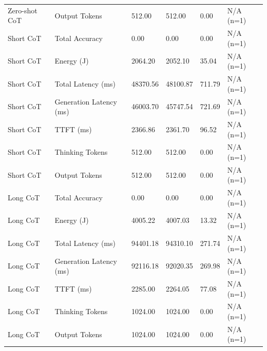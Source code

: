 \begin{table}
\begin{tabular}{llllll}
Zero-shot CoT & Output Tokens & 512.00 & 512.00 & 0.00 & N/A (n=1) \\
Short CoT & Total Accuracy & 0.00 & 0.00 & 0.00 & N/A (n=1) \\
Short CoT & Energy (J) & 2064.20 & 2052.10 & 35.04 & N/A (n=1) \\
Short CoT & Total Latency (ms) & 48370.56 & 48100.87 & 711.79 & N/A (n=1) \\
Short CoT & Generation Latency (ms) & 46003.70 & 45747.54 & 721.69 & N/A (n=1) \\
Short CoT & TTFT (ms) & 2366.86 & 2361.70 & 96.52 & N/A (n=1) \\
Short CoT & Thinking Tokens & 512.00 & 512.00 & 0.00 & N/A (n=1) \\
Short CoT & Output Tokens & 512.00 & 512.00 & 0.00 & N/A (n=1) \\
Long CoT & Total Accuracy & 0.00 & 0.00 & 0.00 & N/A (n=1) \\
Long CoT & Energy (J) & 4005.22 & 4007.03 & 13.32 & N/A (n=1) \\
Long CoT & Total Latency (ms) & 94401.18 & 94310.10 & 271.74 & N/A (n=1) \\
Long CoT & Generation Latency (ms) & 92116.18 & 92020.35 & 269.98 & N/A (n=1) \\
Long CoT & TTFT (ms) & 2285.00 & 2264.05 & 77.08 & N/A (n=1) \\
Long CoT & Thinking Tokens & 1024.00 & 1024.00 & 0.00 & N/A (n=1) \\
Long CoT & Output Tokens & 1024.00 & 1024.00 & 0.00 & N/A (n=1) \\
\bottomrule
\end{tabular}
\end{table}
